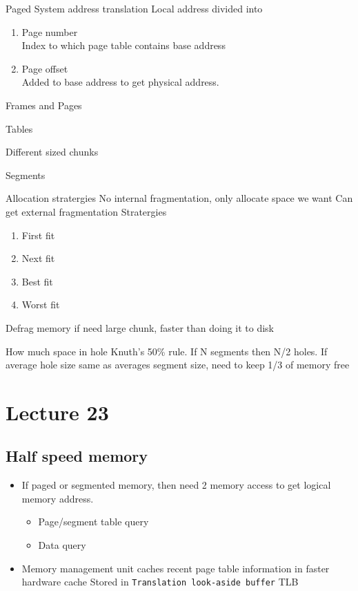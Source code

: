 \documentclass{article}
\begin{document}
	Paged System address translation
		Local address divided into
		\begin{enumerate}
			\item Page number\\
				Index to which page table contains base address
			\item Page offset\\
				Added to base address to get physical address.
		\end{enumerate}

	Frames and Pages

	Tables

	Different sized chunks

	Segments

	Allocation stratergies
		No internal fragmentation, only allocate space we want
		Can get external fragmentation
		Stratergies
		\begin{enumerate}
			\item First fit
			\item Next fit
			\item Best fit
			\item Worst fit
		\end{enumerate}
		Defrag memory if need large chunk, faster than doing it to disk

	How much space in hole
		Knuth's 50\% rule. If N segments then N/2 holes.
		If average hole size same as averages segment size, need to keep 1/3 of memory free


\section{Lecture 23}
	\subsection{Half speed memory}
		\begin{itemize}
			\item If paged or segmented memory, then need 2 memory access to get logical memory address.
			\begin{itemize}
				\item Page/segment table query
				\item Data query
			\end{itemize}

			\item Memory management unit caches recent page table information in faster hardware cache
			Stored in \texttt{Translation look-aside buffer} TLB
		\end{itemize}
\end{document}

